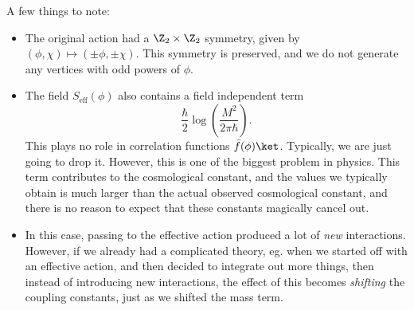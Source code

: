 \documentclass[a4paper]{article}
\begin{document}
A few things to note:
\begin{itemize}
  \item The original action had a $\Z_2 \times \Z_2$ symmetry, given by $(\phi, \chi) \mapsto (\pm \phi, \pm \chi)$. This symmetry is preserved, and we do not generate any vertices with odd powers of $\phi$.
  \item The field $S_{\mathrm{eff}}(\phi)$ also contains a field independent term
    \[
      \frac{\hbar}{2} \log \left(\frac{M^2}{2\pi \hbar}\right).
    \]
    This plays no role in correlation functions $\bar f(\phi)\ket$. Typically, we are just going to drop it. However, this is one of the biggest problem in physics. This term contributes to the cosmological constant, and the values we typically obtain is much larger than the actual observed cosmological constant, and there is no reason to expect that these constants magically cancel out.
  \item In this case, passing to the effective action produced a lot of \emph{new} interactions. However, if we already had a complicated theory, eg. when we started off with an effective action, and then decided to integrate out more things, then instead of introducing new interactions, the effect of this becomes \emph{shifting} the coupling constants, just as we shifted the mass term.
\end{itemize}
\end{document}
